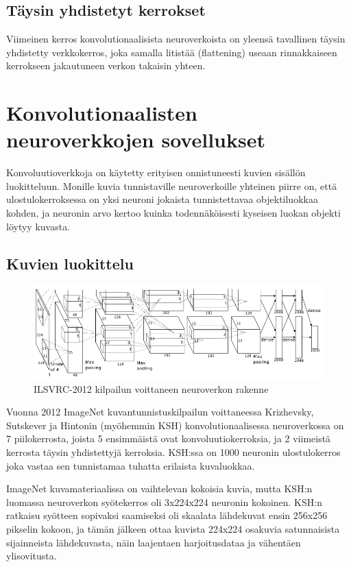 \documentclass[finnish]{tktltiki2}
\theoremstyle{definition}
\theoremstyle{remark}
\begin{document}
    \subsection{Täysin yhdistetyt kerrokset}
    Viimeinen kerros konvolutionaalisista neuroverkoista on yleensä tavallinen täysin yhdistetty verkkokerros, joka samalla litistää (flattening) useaan rinnakkaiseen kerrokseen jakautuneen verkon takaisin yhteen.

  \section{Konvolutionaalisten neuroverkkojen sovellukset}
    Konvoluutioverkkoja on käytetty erityisen onnistuneesti kuvien sisällön luokitteluun. Monille kuvia tunnistaville neuroverkoille yhteinen piirre on, että ulostulokerroksessa on yksi neuroni jokaista tunnistettavaa objektiluokkaa kohden, ja neuronin arvo kertoo kuinka todennäköisesti kyseisen luokan objekti löytyy kuvasta.

  \subsection{Kuvien luokittelu}

    \begin{figure}[h]
    \centering
    \includegraphics[scale=0.4]{imagenet}
    \caption{ILSVRC-2012 kilpailun voittaneen neuroverkon rakenne \cite{KSHimagenet2012}}
    \label{pic:hsk-neuralnet}
    \end{figure}

    Vuonna 2012 ImageNet kuvantunnistuskilpailun voittaneessa Krizhevsky, Sutskever ja Hintonin (myöhemmin KSH) konvolutionaalisessa neuroverkossa on 7 piilokerrosta, joista 5 ensimmäistä ovat konvoluutiokerroksia, ja 2 viimeistä kerrosta täysin yhdistettyjä kerroksia. KSH:ssa on 1000 neuronin ulostulokerros joka vastaa sen tunnistamaa tuhatta erilaista kuvaluokkaa.
    
    ImageNet kuvamateriaalissa on vaihtelevan kokoisia kuvia, mutta KSH:n luomassa neuroverkon syötekerros oli 3x224x224 neuronin kokoinen. KSH:n ratkaisu syötteen sopivaksi saamiseksi oli skaalata lähdekuvat ensin 256x256 pikselin kokoon, ja tämän jälkeen ottaa kuvista 224x224 osakuvia satunnaisista sijainneista lähdekuvasta, näin laajentaen harjoitusdataa ja vähentäen ylisovitusta.
    
\end{document}
